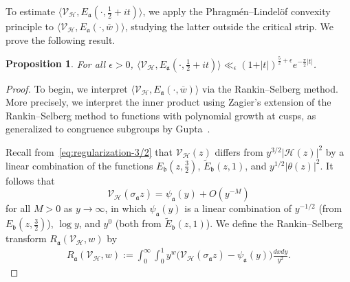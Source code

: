 \documentclass[11pt,reqno]{amsart}
\theoremstyle{plain}
\newtheorem{proposition}[theorem]{Proposition}
\theoremstyle{definition}
\numberwithin{equation}{section}
\begin{document}
To estimate $\langle \mathcal{V}_\mathcal{H}, E_\mathfrak{a}(\cdot, \tfrac{1}{2}+it) \rangle$, we apply the Phragm\'{e}n--Lindel\"{o}f convexity principle to $\langle \mathcal{V}_\mathcal{H}, E_\mathfrak{a}(\cdot, \overline{w}) \rangle$, studying the latter outside the critical strip. We prove the following result.
	
\begin{proposition} \label{prop:V_H-Rankin-Selberg-bound}
For all $\epsilon > 0$, $\langle \mathcal{V}_\mathcal{H}, E_\mathfrak{a}(\cdot, \frac{1}{2} + it) \rangle \ll_{\epsilon} (1 + \vert t \vert)^{\frac{5}{2}+\epsilon} e^{-\frac{\pi}{2} \vert t \vert}$.
\end{proposition}
	
\begin{proof}
To begin, we interpret $\langle \mathcal{V}_\mathcal{H}, E_\mathfrak{a}(\cdot, \overline{w}) \rangle$ via the Rankin--Selberg method. More precisely, we interpret the inner product using Zagier's extension of the Rankin--Selberg method to functions with polynomial growth at cusps, as generalized to congruence subgroups by Gupta~\cite{ZagierRankinSelberg,Gupta00}.

Recall from~\eqref{eq:regularization-3/2} that $\mathcal{V}_\mathcal{H}(z)$ differs from $y^{3/2} \vert \mathcal{H}(z)\vert^2$ by a linear combination of the functions $E_\mathfrak{b}(z, \frac{3}{2})$, $\widetilde{E}_\mathfrak{b}(z,1)$, and $y^{1/2} \vert \theta(z) \vert^2$. It follows that
\[
	\mathcal{V}_\mathcal{H}(\sigma_{\mathfrak{a}} z)
	= \psi_{\mathfrak{a}}(y)  + O(y^{-M})
\]
for all $M>0$ as $y \to \infty$, in which $\psi_\mathfrak{a}(y)$ is a linear combination of $y^{-1/2}$ (from $E_\mathfrak{b}(z,\frac{3}{2})$), $\log y$, and $y^0$ (both from $\widetilde{E}_\mathfrak{b}(z,1)$). We define the Rankin--Selberg transform $R_\mathfrak{a}(\mathcal{V}_\mathcal{H}, w)$ by
\begin{align} \label{eq:Rankin-Selberg-transform}
	R_\mathfrak{a}(\mathcal{V}_\mathcal{H}, w)
		:= \int_0^\infty \int_0^1
		y^w \big( \mathcal{V}_\mathcal{H}(\sigma_\mathfrak{a} z) - \psi_\mathfrak{a}(y) \big) \frac{dxdy}{y^2}.
\end{align}


\end{proof}
\end{document}
